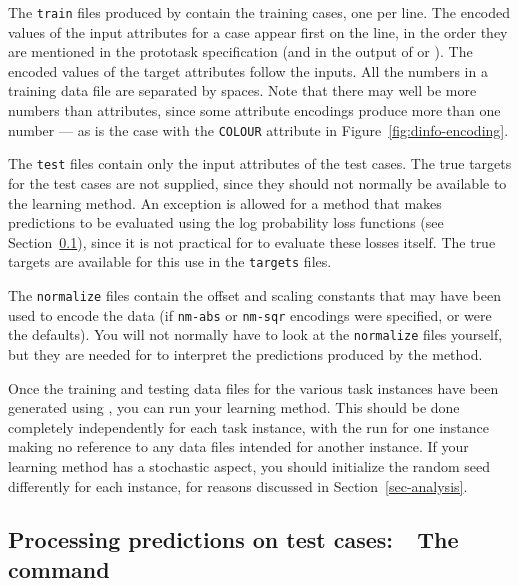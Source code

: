 The \texttt{train} files produced by \mgendata{} contain the training
cases, one per line. The encoded values of the input attributes for a
case appear first on the line, in the order they are mentioned in the
prototask specification (and in the output of \dinfo{} or \minfo{}).
The encoded values of the target attributes follow the inputs.  All
the numbers in a training data file are separated by spaces.  Note
that there may well be more numbers than attributes, since some
attribute encodings produce more than one number --- as is the case
with the \texttt{COLOUR} attribute in Figure~\ref{fig:dinfo-encoding}.

The \texttt{test} files contain only the input attributes of the test
cases.  The true targets for the test cases are not supplied, since
they should not normally be available to the learning method.  An
exception is allowed for a method that makes predictions to be
evaluated using the log probability loss functions (see
Section~\ref{assess-mloss}), since it is not practical for \delve{} to
evaluate these losses itself.  The true targets are available for this
use in the \texttt{targets} files.  

The \texttt{normalize} files contain the offset and scaling constants
that may have been used to encode the data (if \texttt{nm-abs} or
\texttt{nm-sqr} encodings were specified, or were the defaults).  You
will not normally have to look at the \texttt{normalize} files
yourself, but they are needed for \delve{} to interpret the
predictions produced by the method.

Once the training and testing data files for the various task
instances have been generated using \mgendata{}, you can run your
learning method.  This should be done completely independently for
each task instance, with the run for one instance making no reference
to any data files intended for another instance.  If your learning
method has a stochastic aspect, you should initialize the random seed
differently for each instance, for reasons discussed in
Section~\ref{sec-analysis}.


\subsection{Processing predictions on test cases:~~The \mloss{} 
            command}\label{assess-mloss}

